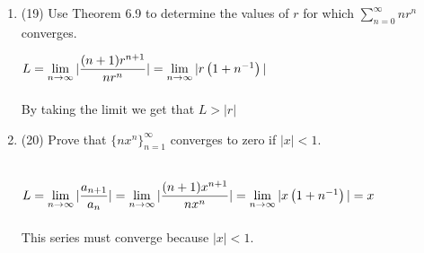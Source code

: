\documentclass[fleqn]{article}
\begin{document}
  \begin{enumerate}
    \item (19) Use Theorem 6.9 to determine the values of $r$ for which $\sum\limits_{n=0}^{\infty} n r^n$ converges.

      \textcolor{hwColor}{
        $ 
          \\
          L=\lim\limits_{n \to \infty} |\dfrac{(n+1) r^{n+1}}{n r^n}|
          =\lim\limits_{n \to \infty} |r \left(1+n^{-1}\right)|
        $
        \\
        \\
        By taking the limit we get that $L>|r|$
        \\
      }

    \item (20) Prove that $\{ n x^n\}_{n=1}^{\infty}$ converges to zero if $|x| < 1$.

      \textcolor{hwColor}{
        \\
        $
          L=\lim\limits_{n \to \infty} |\dfrac{a_{n+1}}{a_n}|
          =\lim\limits_{n \to \infty} |\dfrac{(n+1) x^{n+1}}{n x^n}|
          \\
          \\
          \\
          =\lim\limits_{n \to \infty} |x\left(1+n^{-1}\right)|=x
        $
        \\
        \\
        This series must converge because $|x|<1$.
      }

  \end{enumerate}

  \pagebreak
\end{document}
